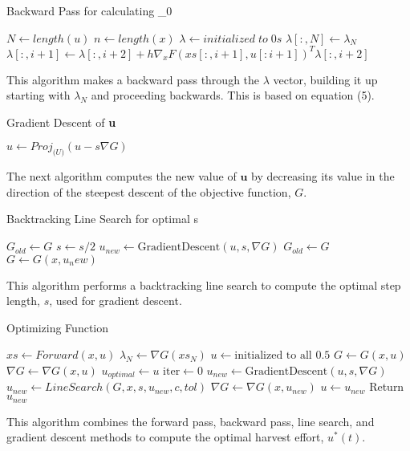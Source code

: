 \documentclass{article}
\begin{document}
\begin{algorithm}
\caption{Backward Pass for calculating \textbf{\lambda}_0}\label{alg:cap}
\begin{algorithmic}
\State $N \gets length(u)$
\State $n \gets length(x)$
\State $\lambda \gets initialized \;to\; 0s$
\State $\lambda [:,N] \gets \lambda_{N}$
\
    \State $\lambda [:, i+1] \gets \lambda [:, i+2] + h\nabla_{x} F(xs[:,i+1],u[:i+1])^T \lambda [:, i+2]$
\EndFor
\end{algorithmic}

\end{algorithm}
This algorithm makes a backward pass through the $\lambda$ vector, building it up starting with $\lambda_{N}$ and proceeding backwards. This is based on equation (5).
\begin{algorithm}
\caption{Gradient Descent of \textbf{u}}\label{alg:cap}
\begin{algorithmic}
\State $u \gets Proj_{\mathcal(U)}(u-s\nabla G)$
\end{algorithmic}
\end{algorithm}
The next algorithm computes the new value of $\textbf{u}$ by decreasing its value in the direction of the steepest descent of the objective function, $G$.
\begin{algorithm}
\caption{Backtracking Line Search for optimal s}\label{alg:cap}
\begin{algorithmic}
\State $G_{old} \gets G$
    \State $s \gets s/2$
    \State $u_{new} \gets \text{GradientDescent}(u,s,\nabla G)$
    \State $G_{old} \gets G$
    \State $G \gets G(x,u_new)$
\EndWhile
\end{algorithmic}
\end{algorithm}

This algorithm performs a backtracking line search to compute the optimal step length, $s$, used for gradient descent.
\begin{algorithm}
\caption{Optimizing Function}\label{alg:cap}
\begin{algorithmic}
\State $xs \gets Forward(x,u)$
\State $\lambda_{N} \gets \nabla G(xs_{N})$
\State $u \gets \text{initialized to all $0.5$}$
\State $G \gets G(x,u)$
\State $\nabla G \gets \nabla G(x,u)$
\State $u_{optimal} \gets u$
\State $\text{iter} \gets 0$
    \State $u_{new} \gets \text{GradientDescent}(u,s,\nabla G)$
    \State $u_{new} \gets LineSearch(G, x, s, u_{new}, c, tol)$
    \State $\nabla G \gets \nabla G(x,u_{new})$
    \State $u \gets u_{new}$
\EndWhile
\State Return $u_{new}$
\end{algorithmic}
\end{algorithm}
\newpage
This algorithm combines the forward pass, backward pass, line search, and gradient descent methods to compute the optimal harvest effort, $u^*(t)$.
\end{document}
